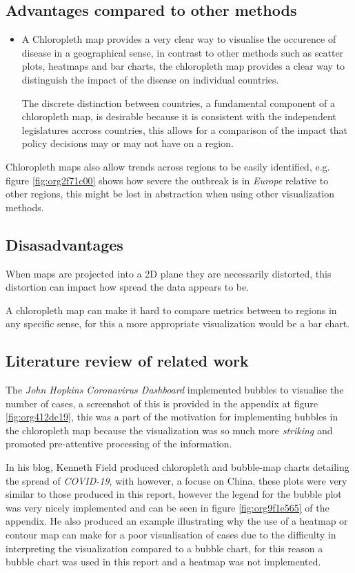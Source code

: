 \documentclass[11pt]{article}
\begin{document}
\subsection{Advantages compared to other methods}
\label{sec:org577682a}
\begin{itemize}
\item A Chloropleth map provides a very clear way to visualise the occurence of
disease in a geographical sense, in contrast to other methods such as scatter
plots, heatmaps and bar charts, the chloropleth map provides a clear way to
distinguish the impact of the disease on individual countries.

The discrete distinction between countries, a fundamental component of a
chloropleth map, is desirable because it is consistent with the independent
legislatures accross countries, this allows for a comparison of the impact
that policy decisions may or may not have on a region.
\end{itemize}

Chloropleth maps also allow trends across regions to be easily identified, e.g.
figure \ref{fig:org2f71c00} shows how severe the outbreak is in \emph{Europe} relative to other
regions, this might be lost in abstraction when using other visualization methods.

\subsection{Disasadvantages}
\label{sec:org16f816a}
When maps are projected into a 2D plane they are necessarily distorted, this
  distortion can impact how spread the data appears to be.

A chloropleth map can make it hard to compare metrics between to regions in any
specific sense, for this a more appropriate visualization would be a bar chart.
\subsection{Literature review of related work}
\label{sec:orgb25c76e}
The \emph{John Hopkins Coronavirus Dashboard} \cite{2020o} implemented bubbles to
visualise the number of cases, a screenshot of this is provided in the appendix
at figure \ref{fig:org412dc19}, this was a part of the motivation for implementing bubbles in
the chloropleth map because the visualization was so much more \emph{striking} and
promoted pre-attentive processing of the information.

\label{orgb5455b6} In his blog, Kenneth Field produced chloropleth and bubble-map charts
detailing the spread of \emph{COVID-19}, with however, a focuse on China, \cite{field2020} these
plots were very similar to those produced in this report, however the legend for
the bubble plot was very nicely implemented and can be seen in figure \ref{fig:org9f1e565} of
the appendix. He also produced an example illustrating why the use of a heatmap
or contour map can make for a poor visualisation of cases due to the difficulty
in interpreting the visualization compared to a bubble chart, for this reason a
bubble chart was used in this report and a heatmap was not implemented.
\end{document}
